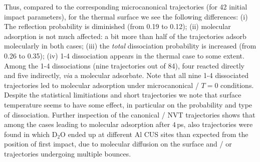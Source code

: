 \documentclass[11pt,DIV=13,BCOR=5mm,a4paper,headinclude]{scrbook}
\begin{document}
Thus, compared to the corresponding microcanonical trajectories (for 42 initial impact parameters), for the thermal surface we see the following differences: (i) The reflection probability is diminished (from 0.19 to 0.12); (ii) molecular adsorption is not much affected: a bit more than half of the trajectories adsorb molecularly in both cases; (iii) the \textit{total} dissociation probability is increased (from 0.26 to 0.35); (iv) 1-4 dissociation appears in the thermal case to some extent.
Among the 1-4 dissociations (nine trajectories out of 84), four reacted directly and five indirectly, \textit{via} a molecular adsorbate.
Note that all nine 1-4 dissociated trajectories led to molecular adsorption under microcanonical / $T=0$ conditions.
Despite  the statistical limitiations and short trajectories we note that surface temperature seems to have some effect, in particular on the probability and type of dissociation.
Further inspection of the canonical / NVT trajectories shows that among the cases leading to molecular adsorption after $4\,$ps, also trajectories were found in which D$_2$O ended up at different Al CUS sites than expected from the position of first impact, due to molecular diffusion on the surface and / or trajectories undergoing multiple bounces.
\end{document}
